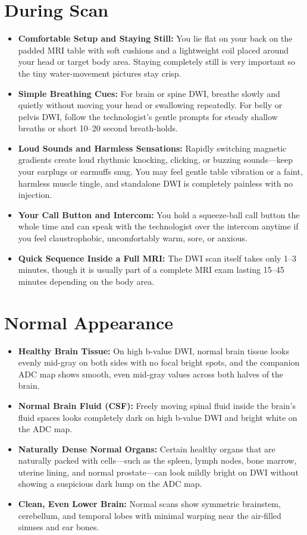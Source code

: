 \section{During Scan}
\begin{itemize}
\item \textbf{Comfortable Setup and Staying Still:} You lie flat on your back on the padded MRI table with soft cushions and a lightweight coil placed around your head or target body area. Staying completely still is very important so the tiny water-movement pictures stay crisp.
\item \textbf{Simple Breathing Cues:} For brain or spine DWI, breathe slowly and quietly without moving your head or swallowing repeatedly. For belly or pelvis DWI, follow the technologist's gentle prompts for steady shallow breaths or short 10--20 second breath-holds.
\item \textbf{Loud Sounds and Harmless Sensations:} Rapidly switching magnetic gradients create loud rhythmic knocking, clicking, or buzzing sounds---keep your earplugs or earmuffs snug. You may feel gentle table vibration or a faint, harmless muscle tingle, and standalone DWI is completely painless with no injection.
\item \textbf{Your Call Button and Intercom:} You hold a squeeze-ball call button the whole time and can speak with the technologist over the intercom anytime if you feel claustrophobic, uncomfortably warm, sore, or anxious.
\item \textbf{Quick Sequence Inside a Full MRI:} The DWI scan itself takes only 1--3 minutes, though it is usually part of a complete MRI exam lasting 15--45 minutes depending on the body area.
\end{itemize}

\section{Normal Appearance}
\begin{itemize}
\item \textbf{Healthy Brain Tissue:} On high b-value DWI, normal brain tissue looks evenly mid-gray on both sides with no focal bright spots, and the companion ADC map shows smooth, even mid-gray values across both halves of the brain.
\item \textbf{Normal Brain Fluid (CSF):} Freely moving spinal fluid inside the brain's fluid spaces looks completely dark on high b-value DWI and bright white on the ADC map.
\item \textbf{Naturally Dense Normal Organs:} Certain healthy organs that are naturally packed with cells---such as the spleen, lymph nodes, bone marrow, uterine lining, and normal prostate---can look mildly bright on DWI without showing a suspicious dark lump on the ADC map.
\item \textbf{Clean, Even Lower Brain:} Normal scans show symmetric brainstem, cerebellum, and temporal lobes with minimal warping near the air-filled sinuses and ear bones.
\end{itemize}

